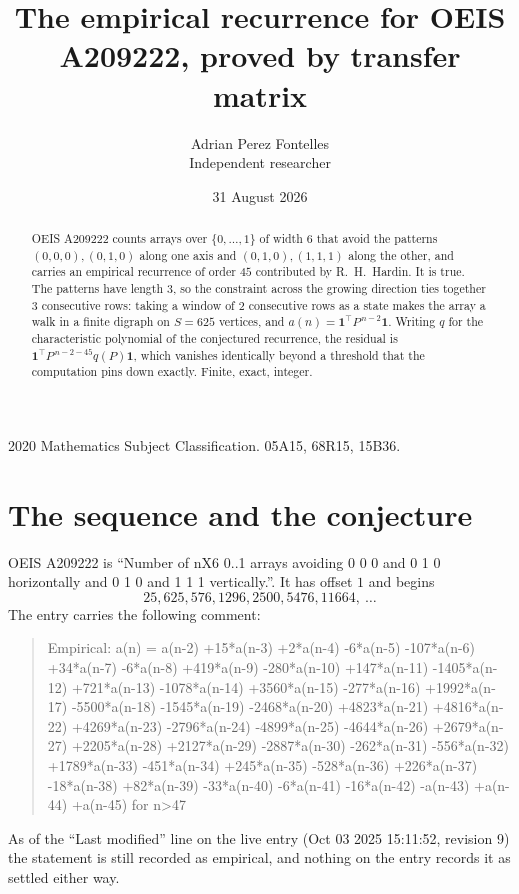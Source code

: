 \documentclass[11pt,a4paper]{article}
\title{The empirical recurrence for OEIS A209222, proved by transfer matrix}
\author{Adrian Perez Fontelles\\ \small Independent researcher}
\date{31 August 2026}
\theoremstyle{plain}
\theoremstyle{definition}
\begin{document}
\maketitle

\begin{abstract}
OEIS A209222 counts arrays over $\{0,\dots,1\}$ of width $6$ that avoid the patterns
$(0,0,0), (0,1,0)$ along one axis and $(0,1,0), (1,1,1)$ along the other, and carries an empirical recurrence of
order $45$ contributed by R.~H.~Hardin. It is true. The patterns have length $3$, so
the constraint across the growing direction ties together $3$ consecutive rows: taking a
window of $2$ consecutive rows as a state makes the array a walk in a finite digraph
on $S=625$ vertices, and $a(n)=\mathbf{1}^{\!\top}P^{\,n-2}\mathbf{1}$. Writing $q$
for the characteristic polynomial of the conjectured recurrence, the residual is
$\mathbf{1}^{\!\top}P^{\,n-2-45}q(P)\mathbf{1}$, which vanishes identically
beyond a threshold that the computation pins down exactly. Finite, exact, integer.
\end{abstract}

\noindent\small 2020 Mathematics Subject Classification. 05A15, 68R15, 15B36.\normalsize

\section{The sequence and the conjecture}

OEIS A209222 is ``Number of nX6 0..1 arrays avoiding 0 0 0 and 0 1 0 horizontally and 0 1 0 and 1 1 1 vertically.''. It has offset
$1$ and begins
\[
25, 625, 576, 1296, 2500, 5476, 11664,\ \dots
\]
The entry carries the following comment:
\begin{quote}\small
Empirical: a(n) = a(n-2) +15*a(n-3) +2*a(n-4) -6*a(n-5) -107*a(n-6) +34*a(n-7) -6*a(n-8) +419*a(n-9) -280*a(n-10) +147*a(n-11) -1405*a(n-12) +721*a(n-13) -1078*a(n-14) +3560*a(n-15) -277*a(n-16) +1992*a(n-17) -5500*a(n-18) -1545*a(n-19) -2468*a(n-20) +4823*a(n-21) +4816*a(n-22) +4269*a(n-23) -2796*a(n-24) -4899*a(n-25) -4644*a(n-26) +2679*a(n-27) +2205*a(n-28) +2127*a(n-29) -2887*a(n-30) -262*a(n-31) -556*a(n-32) +1789*a(n-33) -451*a(n-34) +245*a(n-35) -528*a(n-36) +226*a(n-37) -18*a(n-38) +82*a(n-39) -33*a(n-40) -6*a(n-41) -16*a(n-42) -a(n-43) +a(n-44) +a(n-45) for n>47
\end{quote}
As of the ``Last modified'' line on the live entry (Oct 03 2025 15:11:52, revision
9) the statement is still recorded as empirical, and nothing on the entry
records it as settled either way.
\end{document}
